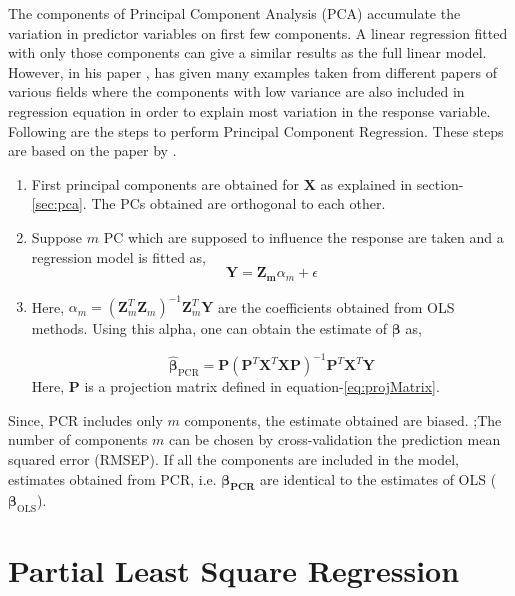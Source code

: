 \documentclass[12pt, lot, lof]{thesis}\usepackage[]{graphicx}\usepackage[]{color}
\newcommand{\bs}[1]{\ensuremath{\boldsymbol{#1}}}
\newcommand{\mbf}[1]{\ensuremath{\mathbf{#1}}}
\begin{document}
The components of Principal Component Analysis (PCA) accumulate the variation in predictor variables on first few components. A linear regression fitted with only those components can give a similar results as the full linear model. However, \citet{jolliffe1982note} in his paper , has given many examples taken from different papers of various fields where the components with low variance are also included in regression equation in order to explain most variation in the response variable. Following are the steps to perform Principal Component Regression. These steps are based on the paper  by \cite{yeniay2002comparison}.

\begin{enumerate}
\item First principal components are obtained for \mbf{X} as explained in section-\ref{sec:pca}. The PCs obtained are orthogonal to each other.
\item Suppose $m$ PC which are supposed to influence the response are taken and a regression model is fitted as,
\begin{equation}
	\mbf{Y}=\mbf{Z_m}\alpha_m+\epsilon
\end{equation}

\item Here, $\alpha_m = \left(\mbf{Z}_m^T\mbf{Z}_m\right)^{-1}\mbf{Z}_m^T\mbf{Y}$ are the coefficients obtained from OLS methods. Using this alpha, one can obtain the estimate of $\bs{\beta}$ as,

\begin{equation}
	\bs{\hat{\beta}}_\text{PCR}=\bs{P}\left(\bs{P}^T\bs{X}^T\bs{XP}\right)^{-1}\bs{P}^T\bs{X}^T\bs{Y}
\end{equation}
Here, \bs{P} is a projection matrix defined in equation-\ref{eq:projMatrix}.
\end{enumerate}
Since, PCR includes only $m$ components, the estimate obtained are biased. ;The number of components $m$ can be chosen by cross-validation the prediction mean squared error (RMSEP). If all the components are included in the model, estimates obtained from PCR, i.e. $\bs{\beta_\text{PCR}}$ are identical to the estimates of OLS ($\bs{\beta}_\text{OLS}$).

\section{Partial Least Square Regression}
\label{sec:pls}
\end{document}
